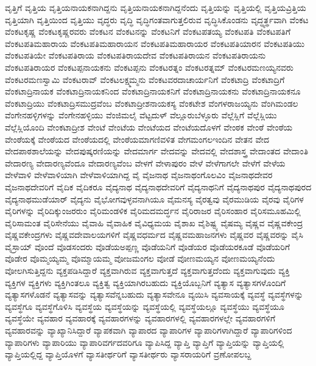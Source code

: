 {ವೃತ್ತಿಗೆ
ವೃತ್ತಿಯ
ವೃತ್ತಿಯನಾಯಕನಾಗಿದ್ದನು
ವೃತ್ತಿಯನಾಯಕನಾಗಿದ್ದನೆಂದು
ವೃತ್ತಿಯನ್ನು
ವೃತ್ತಿಯಲ್ಲಿ
ವೃತ್ತಿಯವ್ರಿತ್ತಿಯ
ವೃತ್ತಿಯಾಗಿ
ವೃತ್ತಿಯಿಂದ
ವೃತ್ತಿಯು
ವೃದ್ಧರು
ವೃದ್ಧಿ
ವೃದ್ಧಿಗಂತವಾಗುತ್ತಲಿರುವ
ವೃದ್ಧಿಸಿಕೊಂಡನು
ವೃದ್ಧ್ಯರ್ತ್ಥವಾಗಿ
ವೆಂಕಟ
ವೆಂಕಟಕೃಷ್ಣ
ವೆಂಕಟಕೃಷ್ಣರವರು
ವೆಂಕಟನ
ವೆಂಕಟನನ್ನು
ವೆಂಕಟನಿಗೆ
ವೆಂಕಟಪತಯ್ಯ
ವೆಂಕಟಪತಿ
ವೆಂಕಟಪತಿಗೆ
ವೆಂಕಟಪತಿಮಹಾರಾಯ
ವೆಂಕಟಪತಿಮಹಾರಾಯನ
ವೆಂಕಟಪತಿಮಹಾರಾಯರ
ವೆಂಕಟಪತಿಯಾರನ
ವೆಂಕಟಪತಿಯು
ವೆಂಕಟಪತಿಯೇ
ವೆಂಕಟಪತಿರಾಯ
ವೆಂಕಟಪತಿರಾಯದೇವ
ವೆಂಕಟಪತಿರಾಯನ
ವೆಂಕಟಪತಿರಾಯನು
ವೆಂಕಟಪತಿರಾಯರ
ವೆಂಕಟಪ್ಪನಾಯಕನು
ವೆಂಕಟಪ್ಪನು
ವೆಂಕಟರತ್ನಂ
ವೆಂಕಟರತ್ನಮ್
ವೆಂಕಟರಮಣಯ್ಯನವರು
ವೆಂಕಟರಮಣಸ್ವಾಮಿ
ವೆಂಕಟರಾವ್
ವೆಂಕಟಲಕ್ಷ್ಮಮ್ಮನು
ವೆಂಕಟವರದಾಚಾರ್ಯನಿಗೆ
ವೆಂಕಟಾದ್ರಿ
ವೆಂಕಟಾದ್ರಿಗೆ
ವೆಂಕಟಾದ್ರಿನಾಯಕ
ವೆಂಕಟಾದ್ರಿನಾಯಕನಿಂದ
ವೆಂಕಟಾದ್ರಿನಾಯಕನಿಗೆ
ವೆಂಕಟಾದ್ರಿನಾಯಕನು
ವೆಂಕಟಾದ್ರಿನಾಯಕನೂ
ವೆಂಕಟಾದ್ರಿಯು
ವೆಂಕಟಾದ್ರಿಸಮುದ್ರವೆಂಬ
ವೆಂಕಟಾದ್ರೀಶನಾಯಕಸ್ಯ
ವೆಂಕಟೇಶ
ವೆಂಗಳರಾಜಯ್ಯನು
ವೆಂಗಿಮಂಡಲ
ವೆಂಗೇನಹಳ್ಳಿಗಳನ್ನು
ವೆಂಗೇನಹಳ್ಳಿಯು
ವೆಂಜಿಮಲೈ
ವೆಟ್ಟದುಳ್
ವೆಲ್ಲೂರುಬೆಳ್ಳೂರು
ವೆಲ್ಲೆಸ್ಲಿಗೆ
ವೆಲ್ಲೆಸ್ಲಿಯು
ವೆಲ್ಲೆಸ್ಲಿಯೊಂದಿ
ವೇಂಕಟಾದ್ರೀಶ
ವೇಂಟೆ
ವೇಂಟೆಯ
ವೇಂಟೆಯದ
ವೇಂಟೆಯದೊಳಗೆ
ವೇಂಠಕ
ವೇಂಠೆ
ವೇಂಠೆಯ
ವೇಂಠೆಯಕ್ಕೆ
ವೇಂಠೆಯದ
ವೇಂಠೆಯದಲ್ಲಿ
ವೇಂಠೆಯಮಾಗಣಿವಳಿತ
ವೇಗಮಂಗಲಇಂದಿನ
ವೇತನ
ವೇದ
ವೇದಪಾಠಶಾಲೆಯನ್ನು
ವೇದಪುಷ್ಕರಣಿಯನ್ನು
ವೇದಮಾರ್ಗ
ವೇದವನ್ನು
ವೇದವಲ್ಲಿ
ವೇದಶಾಸ್ತ್ರ
ವೇದಾಂತದ
ವೇದಾಂತಿ
ವೇದಾರಣ್ಯ
ವೇದಾರಣ್ಯವೆಂದೂ
ವೇದಾರಣ್ಯವೆಂಬ
ವೇಳಗೆ
ವೇಳಾಪುರಂ
ವೇಳೆ
ವೇಳೆಗಾಗಲೇ
ವೇಳೆಗೆ
ವೇಳೆಯ
ವೇಳೆವಾಳಿ
ವೇಳೆವಾಳಿಯಾಗಿ
ವೇಳೆವಾಳಿಯಾಗಿದ್ದ
ವೈ
ವೈಜನಾಥ
ವೈಜನಾಥಂಗೊಲವಿಂ
ವೈಜನಾಥದೇವರ
ವೈಜನಾಥದೇವರಿಗೆ
ವೈದಿಕ
ವೈದಿಕರೂ
ವೈದ್ಯನಾಥ
ವೈದ್ಯನಾಥದೇವರಿಗೆ
ವೈದ್ಯನಾಥನಿಗೆ
ವೈದ್ಯನಾಥಪುರ
ವೈದ್ಯನಾಥಪುರದ
ವೈದ್ಯನಾಥಮುಡೆಯಾರ್
ವೈದ್ಯನು
ವೈಭೋಗವುಳ್ಳವನಾಗಿಯೂ
ವೈಮನಸ್ಯ
ವೈರತ್ವವು
ವೈರಮುಡಿಯ
ವೈರವು
ವೈರಿಗಳ
ವೈರಿಗಳನ್ನು
ವೈರಿದಿಕ್ಕುಂಜರರುಂ
ವೈರಿಮಂಡಳಿಕ
ವೈರಿಮದಮರ್ದ್ಧನ
ವೈರಿರಾಜರ
ವೈರಿಸಂಹಾರ
ವೈರಿಸಮೂಹಮಿಲ್ಲಿ
ವೈರಿಸಾಮಂತ
ವೈರಿಸೇನೆಯು
ವೈವಾಹಿ
ವೈವಾಹಿಕ
ವೈವಿಧ್ಯಮಯ
ವೈಶಾಖ
ವೈಶಿಷ್ಟ್ಯ
ವೈಷಮ್ಯ
ವೈಷ್ಣವ
ವೈಷ್ಣವಕೇಂದ್ರ
ವೈಷ್ಣವಕೇಂದ್ರಗಳು
ವೈಷ್ಣವದೇವಾಲಯಗಳಿಗೆ
ವೈಷ್ಣವಧರ್ಮದ
ವೈಷ್ಣವಮಹಾಜನಗಳು
ವೈಷ್ಣವರ
ವೈಷ್ಣವರನ್ನು
ವೈಸಿ
ವೈಸ್ರಾಯ್
ವೊಂದೆ
ವೊಡಸಂದರು
ವೊಡೆಯಅಪ್ಪಣ್ಣ
ವೊಡೆಯನಿಗೆ
ವೊಡೆಯರ
ವೊಡೆಯರಕೂಡೆ
ವೊಡೆಯರಿಗೆ
ವೊಡೇರ
ವೊಮ್ಮಯ್ಯಮ್ಮ
ವೊಮ್ಮಾಯಮ್ಮ
ವೋಜಮಂಗಲ
ವೋಡೆ
ವೋಣಮಯ್ಯನ
ವೋಣಮಯ್ಯನೆಂದು
ವೋಲಗಿಸುತ್ತಿದ್ದನು
ವ್ಯಕ್ತಪಡಿಸಿದ್ದಾರೆ
ವ್ಯಕ್ತವಾಗಿರುವ
ವ್ಯಕ್ತವಾಗುತ್ತದೆ
ವ್ಯಕ್ತವಾಗುತ್ತದೆಂದು
ವ್ಯಕ್ತವಾಗುವುದು
ವ್ಯಕ್ತಿ
ವ್ಯಕ್ತಿಗಳ
ವ್ಯಕ್ತಿಗಳು
ವ್ಯಕ್ತಿಗಿಂತಲೂ
ವ್ಯಕ್ತಿತ್ವ
ವ್ಯಕ್ತಿಯಾಗಿರಬಹುದು
ವ್ಯಕ್ತಿಯೊಬ್ಬನಿಗೆ
ವ್ಯತ್ಯಾಸ
ವ್ಯತ್ಯಾಸಗಳೊಂದಿಗೆ
ವ್ಯತ್ಯಾಸಗಳೊಡನೆ
ವ್ಯತ್ಯಾಸವನ್ನು
ವ್ಯತ್ಯಾಸವೆನ್ನಬಹುದು
ವ್ಯತ್ಯಾಸವೇನೂ
ವ್ಯಯಿಸಿ
ವ್ಯವಸಾಯಕ್ಕೆ
ವ್ಯವಸ್ಥೆ
ವ್ಯವಸ್ಥೆಗಳನ್ನು
ವ್ಯವಸ್ಥೆಗೂ
ವ್ಯವಸ್ಥೆಗೊಳಿಸಿ
ವ್ಯವಸ್ಥೆಯ
ವ್ಯವಸ್ಥೆಯನ್ನು
ವ್ಯವಸ್ಥೆಯಲ್ಲಿ
ವ್ಯವಸ್ಥೆಯಲ್ಲೂ
ವ್ಯವಸ್ಥೆಯು
ವ್ಯವಸ್ಥೆಯೂ
ವ್ಯವಸ್ಥೆಯೇ
ವ್ಯವಹಾರ
ವ್ಯವಹಾರಕ್ಕೆ
ವ್ಯವಹಾರಗಳನ್ನು
ವ್ಯವಹಾರಗಳಲ್ಲಿ
ವ್ಯವಹಾರಗಳಲ್ಲೇ
ವ್ಯವಹಾರಗಳಿಗೆ
ವ್ಯವಹಾರವನ್ನು
ವ್ಯಾಖ್ಯಾನಿಸಿದ್ದಾರೆ
ವ್ಯಾಪಕವಾಗಿ
ವ್ಯಾಪಾರದ
ವ್ಯಾಪಾರಿಗಳ
ವ್ಯಾಪಾರಿಗಳಾಗಿದ್ದಾರೆ
ವ್ಯಾಪಾರಿಗಳಿಂದ
ವ್ಯಾಪಾರಿಗಳು
ವ್ಯಾಪಾರಿಯು
ವ್ಯಾಪಾರಿವರ್ಗದವರಿಗೂ
ವ್ಯಾಪಿಸಿದ್ದ
ವ್ಯಾಪ್ತಿ
ವ್ಯಾಪ್ತಿಗೆ
ವ್ಯಾಪ್ತಿಯನ್ನು
ವ್ಯಾಪ್ತಿಯಲ್ಲಿ
ವ್ಯಾಪ್ತಿಯಲ್ಲಿದ್ದ
ವ್ಯಾಪ್ತಿಯೊಳಗೆ
ವ್ಯಾಸತೀರ್ಥರಿಗೆ
ವ್ಯಾಸತೀರ್ಥರು
ವ್ಯಾಸರಾಯರಿಗೆ
ವ್ರಣೋಪಲಬ್ದ
}
